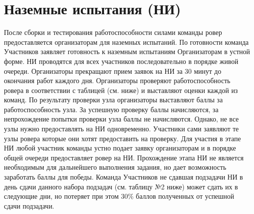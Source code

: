 \section{Наземные испытания (НИ)}

После сборки и тестирования работоспособности силами команды ровер предоставляется организаторам для наземных испытаний. По готовности команда Участников заявляет готовность к наземным испытаниям Организаторам в устной форме. НИ проводятся для всех участников последовательно в порядке живой очереди. Организаторы прекращают прием заявок на НИ за 30 минут до окончания работ каждого дня. Организаторы проверяют работоспособность ровера в соответствии с таблицей (см. ниже) и выставляют оценки каждой из команд. По результату проверки узла организаторы выставляют баллы за работоспособность узла. За успешную проверку баллы начисляются, за непрохождение попытки проверки узла баллы не начисляются. Однако, не все узлы нужно предоставлять на НИ одновременно. Участники сами заявляют те узлы ровера которые они хотят предоставить на проверку. Для участия в этапе НИ любой участник команды устно подает заявку организаторам и в порядке общей очереди предоставляет ровер на НИ. Прохождение этапа НИ не является необходимым для дальнейшего выполнения задания, но дает возможность заработать баллы для победы. Команда Участников не сдавшая подзадачи НИ в день сдачи данного набора подзадач (см. таблицу №2 ниже) может сдать их в следующие дни, но потеряет при этом 30\% баллов полученных от успешной сдачи подзадачи. 

